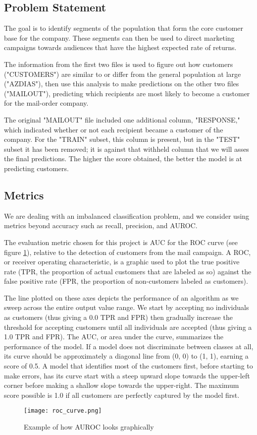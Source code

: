 \subsection{Problem Statement}

The goal is to identify segments of the population that form the core customer base for the company. These segments can then be used to direct marketing campaigns towards audiences that have the highest expected rate of returns.

The information from the first two files is used to figure out how customers ("CUSTOMERS") are similar to or differ from the general population at large ("AZDIAS"), then use this analysis to make predictions on the other two files ("MAILOUT"), predicting which recipients are most likely to become a customer for the mail-order company.

The original "MAILOUT" file included one additional column, "RESPONSE," which indicated whether or not each recipient became a customer of the company. For the "TRAIN" subset, this column is present, but in the "TEST" subset it has been removed; it is against that withheld column that we will asses the final predictions. The higher the score obtained, the better the model is at predicting customers.

\subsection{Metrics}

We are dealing with an imbalanced classification problem, and we consider using metrics beyond accuracy such as recall, precision, and AUROC.

The evaluation metric chosen for this project is AUC for the ROC curve (see figure \ref{fig:auroc}), relative to the detection of customers from the mail campaign. A ROC, or receiver operating characteristic, is a graphic used to plot the true positive rate (TPR, the proportion of actual customers that are labeled as so) against the false positive rate (FPR, the proportion of non-customers labeled as customers).

The line plotted on these axes depicts the performance of an algorithm as we sweep across the entire output value range. We start by accepting no individuals as customers (thus giving a 0.0 TPR and FPR) then gradually increase the threshold for accepting customers until all individuals are accepted (thus giving a 1.0 TPR and FPR). The AUC, or area under the curve, summarizes the performance of the model. If a model does not discriminate between classes at all, its curve should be approximately a diagonal line from (0, 0) to (1, 1), earning a score of 0.5. A model that identifies most of the customers first, before starting to make errors, has its curve start with a steep upward slope towards the upper-left corner before making a shallow slope towards the upper-right. The maximum score possible is 1.0 if all customers are perfectly captured by the model first.

\begin{figure}[h]
\centering
\texttt{[image: roc\_curve.png]}
\caption{Example of how AUROC looks graphically}
\label{fig:auroc}
\end{figure}